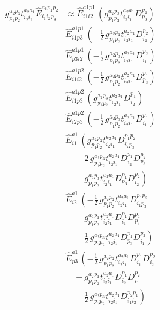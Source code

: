 \documentclass[11pt]{article}
\begin{document}
\begin{align}
g^{a_{2}p_{3}}_{p_{1}p_{2}} t^{a_{2}a_{1}}_{i_{2}i_{1}} \hat{E}^{a_{1}p_{1}p_{2}}_{i_{1}i_{2}p_{3}} &\approx \hat{E}^{a1p1}_{i1i2}\,\left(g^{a_{2}p_{3}}_{p_{1}p_{2}} t^{a_{2}a_{1}}_{i_{2}i_{1}} D^{p_{2}}_{p_{3}} \right) \\
&\hat{E}^{a1p1}_{i1p3}\,\left(- \tfrac{1}{2}\, g^{a_{2}p_{3}}_{p_{1}p_{2}} t^{a_{2}a_{1}}_{i_{2}i_{1}} D^{p_{2}}_{i_{2}} \right) \\
&\hat{E}^{a1p1}_{p3i2}\,\left(- \tfrac{1}{2}\, g^{a_{2}p_{3}}_{p_{1}p_{2}} t^{a_{2}a_{1}}_{i_{2}i_{1}} D^{p_{2}}_{i_{1}} \right) \\
&\hat{E}^{a1p2}_{i1i2}\,\left(- \tfrac{1}{2}\, g^{a_{2}p_{3}}_{p_{1}p_{2}} t^{a_{2}a_{1}}_{i_{2}i_{1}} D^{p_{1}}_{p_{3}} \right) \\
&\hat{E}^{a1p2}_{i1p3}\,\left(g^{a_{2}p_{3}}_{p_{1}p_{2}} t^{a_{2}a_{1}}_{i_{2}i_{1}} D^{p_{1}}_{i_{2}} \right) \\
&\hat{E}^{a1p2}_{i2p3}\,\left(- \tfrac{1}{2}\, g^{a_{2}p_{3}}_{p_{1}p_{2}} t^{a_{2}a_{1}}_{i_{2}i_{1}} D^{p_{1}}_{i_{1}} \right) \\
&\hat{E}^{a1}_{i1}\,\left(g^{a_{2}p_{3}}_{p_{1}p_{2}} t^{a_{2}a_{1}}_{i_{2}i_{1}} D^{p_{1}p_{2}}_{i_{2}p_{3}} \right. \\
&\left.\quad - 2\, g^{a_{2}p_{3}}_{p_{1}p_{2}} t^{a_{2}a_{1}}_{i_{2}i_{1}} D^{p_{1}}_{i_{2}} D^{p_{2}}_{p_{3}} \right. \\
&\left.\quad + g^{a_{2}p_{3}}_{p_{1}p_{2}} t^{a_{2}a_{1}}_{i_{2}i_{1}} D^{p_{1}}_{p_{3}} D^{p_{2}}_{i_{2}} \right) \\
&\hat{E}^{a1}_{i2}\,\left(- \tfrac{1}{2}\, g^{a_{2}p_{3}}_{p_{1}p_{2}} t^{a_{2}a_{1}}_{i_{2}i_{1}} D^{p_{1}p_{2}}_{i_{1}p_{3}} \right. \\
&\left.\quad + g^{a_{2}p_{3}}_{p_{1}p_{2}} t^{a_{2}a_{1}}_{i_{2}i_{1}} D^{p_{1}}_{i_{1}} D^{p_{2}}_{p_{3}} \right. \\
&\left.\quad - \tfrac{1}{2}\, g^{a_{2}p_{3}}_{p_{1}p_{2}} t^{a_{2}a_{1}}_{i_{2}i_{1}} D^{p_{1}}_{p_{3}} D^{p_{2}}_{i_{1}} \right) \\
&\hat{E}^{a1}_{p3}\,\left(- \tfrac{1}{2}\, g^{a_{2}p_{3}}_{p_{1}p_{2}} t^{a_{2}a_{1}}_{i_{2}i_{1}} D^{p_{1}}_{i_{1}} D^{p_{2}}_{i_{2}} \right. \\
&\left.\quad + g^{a_{2}p_{3}}_{p_{1}p_{2}} t^{a_{2}a_{1}}_{i_{2}i_{1}} D^{p_{1}}_{i_{2}} D^{p_{2}}_{i_{1}} \right. \\
&\left.\quad - \tfrac{1}{2}\, g^{a_{2}p_{3}}_{p_{1}p_{2}} t^{a_{2}a_{1}}_{i_{2}i_{1}} D^{p_{2}p_{1}}_{i_{1}i_{2}} \right)
\end{align}
\end{document}
